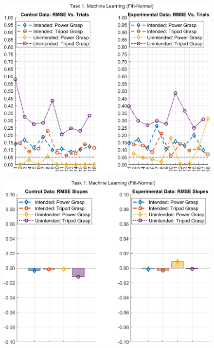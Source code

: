 \documentclass[12pt]{article}
\newcommand\figWidth{7in}
\begin{document}
\begin{figure}
    \includegraphics[width = \figWidth]{t1-rmse-fnorm.png}
\end{figure}
\begin{figure}
    \includegraphics[width = \figWidth]{t1-bar-fnorm.png}
\end{figure}
\end{document}

